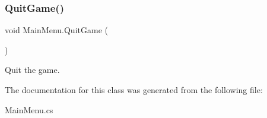 \subsubsection{\texorpdfstring{Quit\+Game()}{QuitGame()}}
{\footnotesize\ttfamily void Main\+Menu.\+Quit\+Game (\begin{DoxyParamCaption}{ }\end{DoxyParamCaption})}



Quit the game. 



The documentation for this class was generated from the following file\+:\begin{DoxyCompactItemize}
\item 
Main\+Menu.\+cs\end{DoxyCompactItemize}
